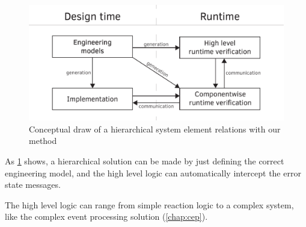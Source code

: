 \begin{figure}[h]
	\centering
	\includegraphics[width=0.8\linewidth]{include/figures/chapter_3/abstract_diagram}
	\caption{Conceptual draw of a hierarchical system element relations with our method}
	\label{fig:overview:abstract_diagram}
\end{figure}

As \cref{fig:overview:abstract_diagram} shows, a hierarchical solution can be made by just defining the correct engineering model, and the high level logic can automatically intercept the error state messages.

The high level logic can range from simple reaction logic to a complex system, like the complex event processing solution (\vref{chap:cep}).
